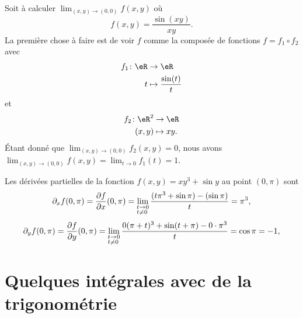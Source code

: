\begin{example}
	Soit à calculer $\lim_{(x,y)\to(0,0)}f(x,y)$ où
	\begin{equation}
		f(x,y)=\frac{ \sin(xy) }{ xy }.
	\end{equation}
	La première chose à faire est de voir $f$ comme la composée de fonctions $f=f_1\circ f_2$ avec
	\begin{equation}
		\begin{aligned}
			f_1\colon \eR&\to \eR \\
			t&\mapsto \frac{ \sin(t) }{ t }
		\end{aligned}
	\end{equation}
	et
	\begin{equation}
		\begin{aligned}
			f_2\colon \eR^2&\to \eR \\
			(x,y)&\mapsto xy.
		\end{aligned}
	\end{equation}
	Étant donné que $\lim_{(x,y)\to(0,0)}f_2(x,y)=0$, nous avons $\lim_{(x,y)\to(0,0)}f(x,y)=\lim_{t\to 0} f_1(t)=1$.
\end{example}

\begin{example}     \label{EXooETZYooYsKPDJ}
Les dérivées partielles de la fonction $f(x,y)=xy^3+\sin y$ au point $(0,\pi)$ sont
\[
\partial_xf(0,\pi)=\frac{ \partial f }{ \partial x }(0,\pi)=\lim_{\begin{subarray}{l}
    t\to 0\\ t\neq 0
  \end{subarray}} \frac{(t\pi^3+\sin \pi)-(\sin \pi)}{t}= \pi^3,
\]
\[
\partial_yf(0,\pi)=\frac{ \partial f }{ \partial y }(0,\pi)=\lim_{\begin{subarray}{l}
    t\to 0\\ t\neq 0
  \end{subarray}} \frac{0(\pi+t)^3+\sin (t+\pi)-0\cdot \pi^3}{t}= \cos \pi=-1,
\]
\end{example}

\section{Quelques intégrales avec de la trigonométrie}
\label{SECooOOPPooZLbaEH}


